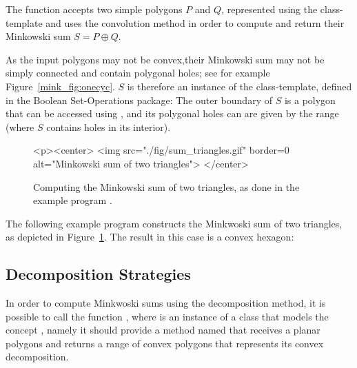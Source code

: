 The function  accepts two simple polygons $P$
and $Q$, represented using the 
class-template and uses the convolution method in order to compute and
return their Minkowski sum $S = P \oplus Q$.

As the input polygons may not be convex,their Minkowski sum may not be
simply connected and contain polygonal holes; see for example
Figure~\ref{mink_fig:onecyc}. $S$ is therefore an instance of the
 class-template, defined in the
Boolean Set-Operations package: The outer boundary of $S$ is a polygon that
can be accessed using , and its polygonal holes can
are given by the range \ccc{[S.holes_begin(), S.holes_end())} (where $S$
contains  holes in its interior).

\begin{figure}[t]
\begin{ccTexOnly}
  \begin{center}
  
  \end{center}
\end{ccTexOnly}
\begin{ccHtmlOnly}
  <p><center>
  <img src="./fig/sum_triangles.gif" border=0 alt="Minkowski sum of two triangles">
  </center>
\end{ccHtmlOnly}
\caption{Computing the Minkowski sum of two triangles, as done
in the example program .}
\label{mink_fig:sum_tri}
\end{figure}

The following example program constructs the Minkwoski sum of two triangles,
as depicted in Figure~\ref{mink_fig:sum_tri}. The result in this case is
a convex hexagon:



\subsection{Decomposition Strategies}
\label{mink_ssec:decomp}

In order to compute Minkwoski sums using the decomposition method, it is
possible to call the function , where
 is an instance of a class that models the concept
, namely it should provide a method named
 that receives a planar polygons and returns a range
of convex polygons that represents its convex decomposition.

